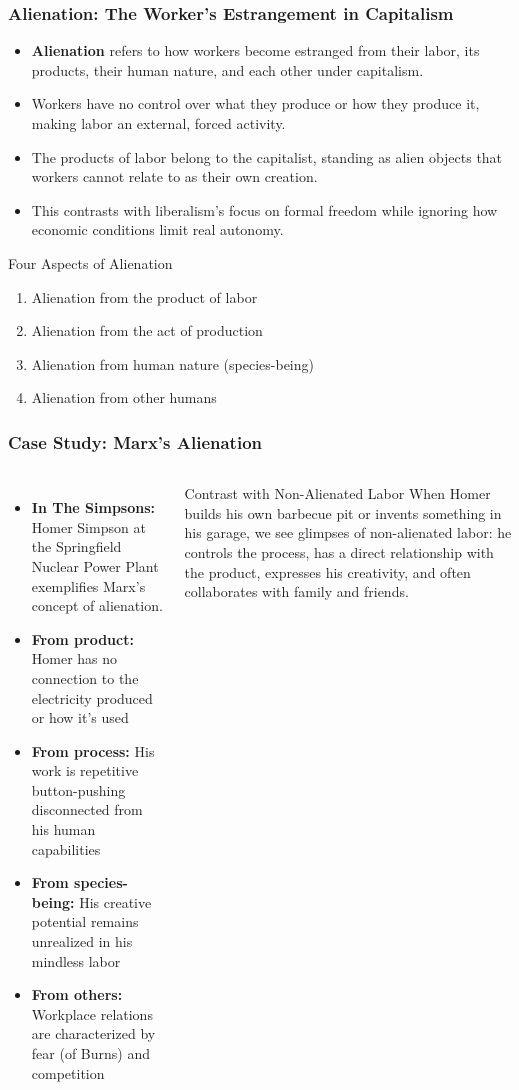 \documentclass{beamer}
\begin{document}
\begin{frame}
\frametitle{Alienation: The Worker's Estrangement in Capitalism}
\begin{itemize}
    \item \textbf{Alienation} refers to how workers become estranged from their labor, its products, their human nature, and each other under capitalism.
    \item Workers have no control over what they produce or how they produce it, making labor an external, forced activity.
    \item The products of labor belong to the capitalist, standing as alien objects that workers cannot relate to as their own creation.
    \item This contrasts with liberalism's focus on formal freedom while ignoring how economic conditions limit real autonomy.
\end{itemize}

\begin{block}{Four Aspects of Alienation}
\begin{enumerate}
    \item Alienation from the product of labor
    \item Alienation from the act of production
    \item Alienation from human nature (species-being)
    \item Alienation from other humans
\end{enumerate}
\end{block}
\end{frame}

\begin{frame}
    \frametitle{Case Study: Marx's Alienation}
    \begin{columns}
    \begin{itemize}
        \item \textbf{In The Simpsons:} Homer Simpson at the Springfield Nuclear Power Plant exemplifies Marx's concept of alienation.
        \item \textbf{From product:} Homer has no connection to the electricity produced or how it's used
        \item \textbf{From process:} His work is repetitive button-pushing disconnected from his human capabilities
        \item \textbf{From species-being:} His creative potential remains unrealized in his mindless labor
        \item \textbf{From others:} Workplace relations are characterized by fear (of Burns) and competition
    \end{itemize}
    
    \begin{exampleblock}{Contrast with Non-Alienated Labor}
    When Homer builds his own barbecue pit or invents something in his garage, we see glimpses of non-alienated labor: he controls the process, has a direct relationship with the product, expresses his creativity, and often collaborates with family and friends.
    \end{exampleblock}
    \end{columns}
    \end{frame}
    
\end{document}

